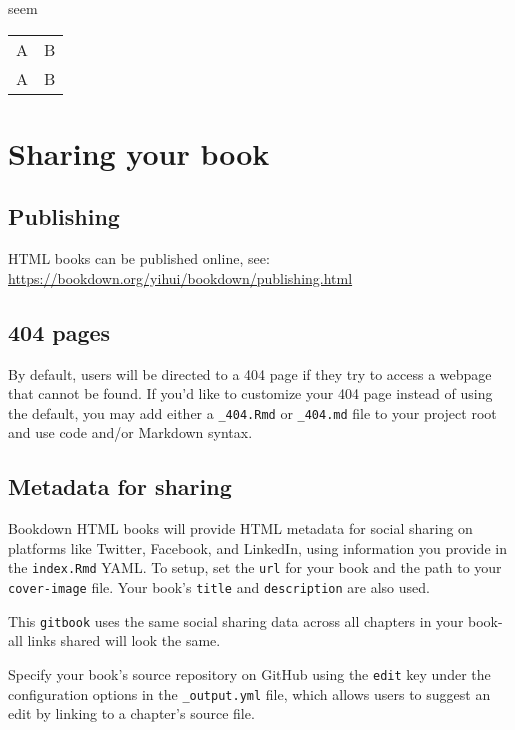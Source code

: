 \documentclass[
]{book}
\begin{document}
seem

\begin{tabular}{ll}
A & B \\
A & B \\
\end{tabular}

\hypertarget{sharing-your-book}{%
\chapter{Sharing your book}\label{sharing-your-book}}

\hypertarget{publishing}{%
\section{Publishing}\label{publishing}}

HTML books can be published online, see: \url{https://bookdown.org/yihui/bookdown/publishing.html}

\hypertarget{pages}{%
\section{404 pages}\label{pages}}

By default, users will be directed to a 404 page if they try to access a webpage that cannot be found. If you'd like to customize your 404 page instead of using the default, you may add either a \texttt{\_404.Rmd} or \texttt{\_404.md} file to your project root and use code and/or Markdown syntax.

\hypertarget{metadata-for-sharing}{%
\section{Metadata for sharing}\label{metadata-for-sharing}}

Bookdown HTML books will provide HTML metadata for social sharing on platforms like Twitter, Facebook, and LinkedIn, using information you provide in the \texttt{index.Rmd} YAML. To setup, set the \texttt{url} for your book and the path to your \texttt{cover-image} file. Your book's \texttt{title} and \texttt{description} are also used.

This \texttt{gitbook} uses the same social sharing data across all chapters in your book- all links shared will look the same.

Specify your book's source repository on GitHub using the \texttt{edit} key under the configuration options in the \texttt{\_output.yml} file, which allows users to suggest an edit by linking to a chapter's source file.
\end{document}
